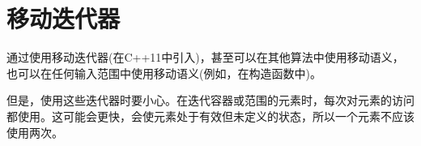 \section{移动迭代器}
通过使用移动迭代器(在C++11中引入)，甚至可以在其他算法中使用移动语义，也可以在任何输入范围中使用移动语义(例如，在构造函数中)。

但是，使用这些迭代器时要小心。在迭代容器或范围的元素时，每次对元素的访问都使用。这可能会更快，会使元素处于有效但未定义的状态，所以一个元素不应该使用两次。
































































